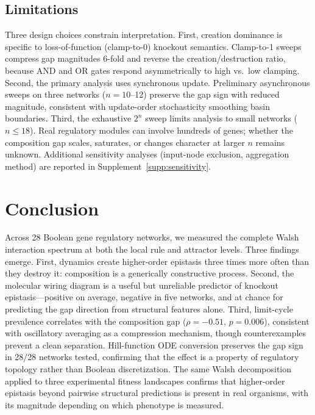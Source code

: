 \documentclass[10pt]{article}
\begin{document}
\subsection{Limitations}

Three design choices constrain interpretation.
First, creation dominance is specific to loss-of-function (clamp-to-0)
knockout semantics. Clamp-to-1 sweeps compress gap magnitudes 6-fold
and reverse the creation/destruction ratio, because AND and OR gates
respond asymmetrically to high vs.\ low clamping.
Second, the primary analysis uses synchronous update.
Preliminary asynchronous sweeps on three networks ($n = 10$--12)
preserve the gap sign with reduced magnitude, consistent with
update-order stochasticity smoothing basin boundaries.
Third, the exhaustive $2^n$ sweep limits analysis to small
networks ($n \leq 18$). Real regulatory modules can involve
hundreds of genes; whether the composition gap scales, saturates,
or changes character at larger $n$ remains unknown.
Additional sensitivity analyses (input-node exclusion,
aggregation method) are reported in
Supplement~\ref{supp:sensitivity}.


\section{Conclusion}
\label{sec:conclusion}

Across 28 Boolean gene regulatory networks, we measured the complete
Walsh interaction spectrum at both the local rule and attractor
levels. Three findings emerge. First, dynamics create higher-order
epistasis three times more often than they destroy it: composition
is a generically constructive process. Second, the molecular wiring
diagram is a useful but unreliable predictor of knockout
epistasis---positive on average, negative in five networks, and at
chance for predicting the gap direction from structural features
alone. Third, limit-cycle prevalence correlates with the composition
gap ($\rho = -0.51$, $p = 0.006$), consistent with oscillatory
averaging as a compression mechanism, though counterexamples prevent
a clean separation. Hill-function ODE conversion preserves the gap
sign in 28/28 networks tested, confirming that the effect is a
property of regulatory topology rather than Boolean discretization.
The same Walsh decomposition applied to three experimental fitness
landscapes confirms that higher-order epistasis beyond pairwise
structural predictions is present in real organisms, with its
magnitude depending on which phenotype is measured.
\end{document}
